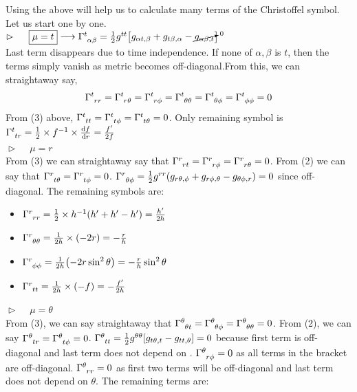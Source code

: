 Using the above will help us to calculate many terms of the Christoffel symbol. Let us start one by one. \\[0.15cm]
$\vartriangleright\quad\ \boxed{\mu = t} \longrightarrow \chris{t}{\alpha}{\beta} = \frac{1}{2}g^{tt}\qty[g_{\alpha t,\beta} + g_{t\beta,\alpha} - \cancelto{0}{g_{\alpha\beta,t}}]$ \\[0.2cm]
Last term disappears due to time independence. If none of $\alpha,\beta $ is $t$, then the terms simply vanish as metric becomes off-diagonal.From this, we can straightaway say, 
$$\chris{t}{r}{r}=\chris{t}{r}{\theta}= \chris{t}{r}{\phi} =\chris{t}{\theta}{\theta}= \chris{t}{\theta}{\phi}= \chris{t}{\phi}{\phi} =0$$
From (3) above, $\chris{t}{t}{t} = \chris{t}{t}{\phi}= \chris{t}{t}{\theta}=0$. Only remaining symbol is ${\chris{t}{t}{r} = \frac{1}{2}\times f^{-1} \times \dv{f}{r} = \frac{f'}{2f}} $ \\[0.2cm]
$\vartriangleright\quad\ \boxed{\mu = r}$\\[0.2cm]
From (3) we can straightaway say that $\chris{r}{r}{t}=\chris{r}{r}{\phi}=\chris{r}{r}{\theta}=0$. From (2) we can say that $\chris{r}{t}{\theta}=\chris{r}{t}{\phi}=0$. $\chris{r}{\theta}{\phi} = \frac{1}{2}g^{rr}(g_{r\theta,\phi} + g_{r\phi,\theta}-g_{\theta\phi,r})=0$ since off-diagonal. The remaining symbols are:
\begin{itemize}
    \item $\chris{r}{r}{r} = \frac{1}{2}\times h^{-1} (h' + h' - h') = \frac{h'}{2h}$
    \item $\chris{r}{\theta}{\theta} = \frac{1}{2h}\times (-2r) = -\frac{r}{h}$
    \item  $\chris{r}{\phi}{\phi} = \frac{1}{2h} \qty(-2r\sin^2\theta) = -\frac{r}{h}\sin^2\theta$ 
    \item $\chris{r}{t}{t} = \frac{1}{2h}\times (-f) = -\frac{f'}{2h}$
\end{itemize}
$\vartriangleright\quad\ \boxed{\mu = \theta}$\\[0.2cm]
From (3), we can say straightaway that $\chris{\theta}{\theta}{t} = \chris{\theta}{\theta}{\phi}=\chris{\theta}{\theta}{\theta}=0$. From (2), we can say $\chris{\theta}{t}{r} =\chris{\theta}{t}{\phi}=0 $. $\chris{\theta}{t}{t} = \frac{1}{2}g^{\theta\theta}\qty[g_{t\theta,t}-g_{tt,\theta}] =0 $ because first term is off-diagonal and last term does not depend on \theta. $\chris{\theta}{r}{\phi} =0$ as all terms in the bracket are off-diagonal. $\chris{\theta}{r}{r} = 0$ as first two terms will be off-diagonal and last term does not depend on $\theta$. The remaining terms are:
